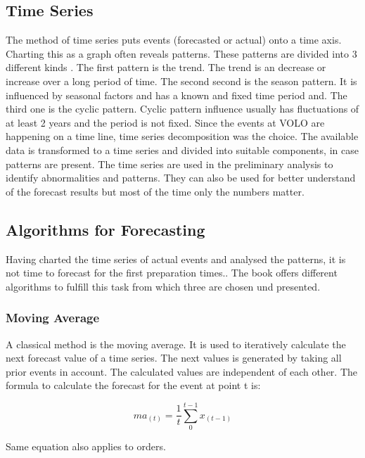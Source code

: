 \subsection{Time Series}\label{subsection:Time Series}
The method of time series puts events (forecasted or actual) onto a time axis. Charting this as a graph often reveals patterns. These patterns are divided into 3 different kinds \cite{Hyndman.2013}. The first pattern is the trend. The trend is an decrease or increase over a long period of time. The second second is the season pattern. It is influenced by seasonal factors and has a known and fixed time period and. The third one is the cyclic pattern. Cyclic pattern influence usually has fluctuations of at least 2 years and the period is not fixed. Since the events at VOLO are happening on a time line, time series decomposition was the choice. The available data is transformed to a time series and divided into suitable components, in case patterns are present.\newline
The time series are used in the preliminary analysis to identify abnormalities and patterns. They can also be used for better understand of the forecast results but most of the time only the numbers matter.
\subsection{Algorithms for Forecasting}\label{subsection:Algorithms for Forecasting}
Having charted the time series of actual events and analysed the patterns, it is not time to forecast for the first preparation times.. The book offers different algorithms to fulfill this task from which three are chosen und presented.
\subsubsection{Moving Average}\label{subsubsection:Moving Average}
A classical method is the moving average. It is used to iteratively calculate the next forecast value of a time series. The next values is generated by taking all prior events in account. The calculated values are independent of each other. The formula to calculate the forecast for the event at point t is:
\begin{center}
\begin{equation}
ma_{(t)}= \frac{1}{t}\sum^{t-1}_0 x_{(t-1)}
\end{equation}
\end{center}
Same equation also applies to orders.

